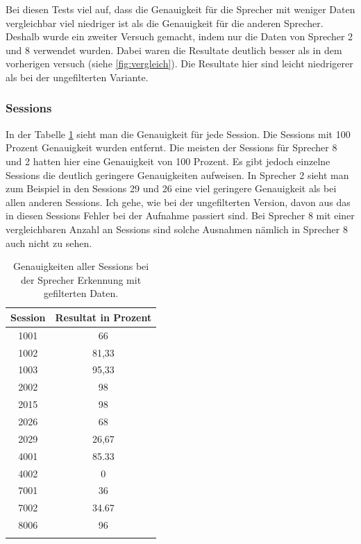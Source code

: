 Bei diesen Tests viel auf, dass die Genauigkeit für die Sprecher mit weniger Daten vergleichbar viel niedriger ist als die Genauigkeit für die anderen Sprecher. Deshalb wurde ein zweiter Versuch gemacht, indem nur die Daten von Sprecher 2 und 8 verwendet wurden. Dabei waren die Resultate deutlich besser als in dem vorherigen versuch (siehe \ref{fig:vergleich}). Die Resultate hier sind leicht niedrigerer als bei der ungefilterten Variante.


\subsubsection{Sessions}
In der Tabelle \ref{tab:FilteredSessions} sieht man die Genauigkeit für jede Session. Die Sessions mit 100 Prozent Genauigkeit wurden entfernt.
Die meisten der Sessions für Sprecher 8 und 2 hatten hier eine Genauigkeit von 100 Prozent. Es gibt jedoch einzelne Sessions die deutlich geringere Genauigkeiten aufweisen. In Sprecher 2 sieht man zum Beispiel in den Sessions 29 und 26 eine viel geringere Genauigkeit als bei allen anderen Sessions. Ich gehe, wie bei der ungefilterten Version, davon aus das in diesen Sessions Fehler bei der Aufnahme passiert sind. Bei Sprecher 8 mit einer vergleichbaren Anzahl an Sessions sind solche Ausnahmen nämlich in Sprecher 8 auch nicht zu sehen.

\begin{table}[H]
 \centering
 \caption{Genauigkeiten aller Sessions bei der Sprecher Erkennung mit gefilterten Daten.}
\begin{tabular}{|c|c|}
\hline 
Session & Resultat in Prozent \\ 
\hline 
1001 & 66 \\ 
\hline 
1002 & 81,33 \\ 
\hline 
1003 & 95,33 \\ 
\hline 
2002 & 98 \\ 
\hline 
2015 & 98 \\ 
\hline 
2026 & 68 \\  
\hline 
2029 & 26,67 \\ 
\hline 
4001 & 85.33 \\ 
\hline 
4002 & 0 \\ 
\hline 
7001 & 36 \\ 
\hline 
7002 & 34.67 \\ 
\hline 
8006 & 96 \\ 
\hline 
\label{tab:FilteredSessions} 
\end{tabular} 
\end{table}

